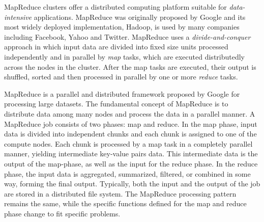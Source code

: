 \documentclass[conference]{IEEEtran}
\begin{document}
MapReduce clusters offer a distributed computing platform suitable for \textit{data-intensive} applications. 
MapReduce was originally proposed by Google and its most widely deployed implementation, Hadoop, is used by many companies including Facebook, Yahoo and Twitter.
MapReduce uses a \textit{divide-and-conquer} approach in which input data are divided into fixed size units processed independently and in parallel by \textit{map} tasks, which are executed distributedly across the nodes in the cluster. After the map tasks are executed, their output is shuffled, sorted and then processed in parallel by one or more \textit{reduce} tasks.

MapReduce is a parallel and distributed framework proposed by Google for processing large datasets. 
The fundamental concept of MapReduce is to distribute data among many nodes and process the data in a parallel manner. 
A MapReduce job consists of two phases: map and reduce. 
In the map phase, input data is divided into independent chunks and each chunk is assigned to one of the compute nodes. 
Each chunk is processed by a map task in a completely parallel manner, yielding intermediate key-value pairs data. 
This intermediate data is the output of the map-phase, as well as the input for the reduce phase. In the reduce phase, the input data is aggregated, summarized, filtered, or combined in some way, forming the final output. 
Typically, both the input and the output of the job are stored in a distributed file system. 
The MapReduce processing pattern remains the same, while the specific functions defined for the map and reduce phase change to fit specific problems.
\end{document}
